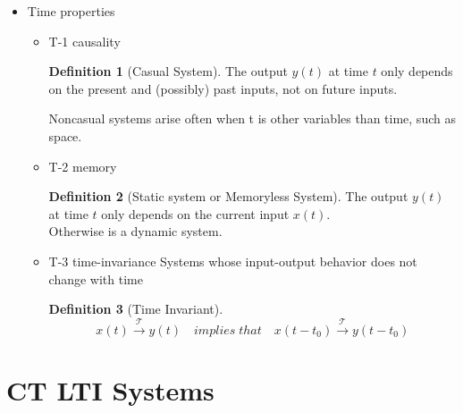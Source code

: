 \documentclass{article}
\theoremstyle{definition}
\newtheorem{definition}{Definition}[subsection]
\begin{document}
\begin{itemize}
\begin{itemize}
\begin{equation}
                \end{equation}
        \end{itemize}
    \item Time properties
        \begin{itemize}
            \item T-1 causality
                \begin{definition}[Casual System]
                    The output $ y(t) $ at time $ t $ only depends on the present and (possibly) past inputs, not on future inputs.
                \end{definition}
                Noncasual systems arise often when t is other variables than time, such as space.
            \item T-2 memory
                \begin{definition}[Static system or Memoryless System]
                    The output $ y(t) $ at time $ t $ only depends on the current input $ x(t) $.\\
                    Otherwise is a dynamic system.
                \end{definition}                
            \item T-3 time-invariance
                Systems whose input-output behavior does not change with time
                \begin{definition}[Time Invariant]
                    \begin{equation}
                        x(t)\mathop{\rightarrow}\limits^{\mathcal{T}}y(t) \quad implies\; that \quad x(t-t_0)\mathop{\rightarrow}\limits^{\mathcal{T}}y(t-t_0)
                    \end{equation}
                \end{definition}
        \end{itemize}
\end{itemize}


\section{CT LTI Systems}
\end{document}
